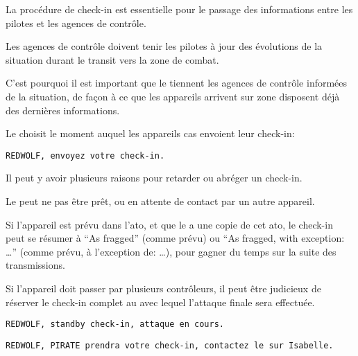 La procédure de check-in est essentielle pour le passage des informations entre les pilotes et les agences de contrôle.

Les agences de contrôle doivent tenir les pilotes à jour des évolutions de la situation durant le transit vers la zone de combat.

C'est pourquoi il est important que le \ja{} tiennent les agences de contrôle informées de la situation, de façon à ce que les appareils arrivent sur zone disposent déjà des dernières informations.

\begin{e1}
	
	\begin{minipage}{\linewidth}
		\item Le \ja{} choisit le moment auquel les appareils \gls{cas} envoient leur check-in:
		
		\begin{lstlisting}[caption=Check-in: envoi, label=checkinsend]
	REDWOLF, envoyez votre check-in.
		\end{lstlisting}
	\end{minipage}
	
	\item Il peut y avoir plusieurs raisons pour retarder ou abréger un check-in.
	
	Le \ja{} peut ne pas être prêt, ou en attente de contact par un autre appareil.
	
	Si l'appareil est prévu dans l'\gls{ato}, et que le \ja{} a une copie de cet \gls{ato}, le check-in peut se résumer à ``As fragged'' (comme prévu) ou ``As fragged, with exception: \ldots{}'' (comme prévu, à l'exception de: \ldots{}), pour gagner du temps sur la suite des transmissions.
	
	Si l'appareil doit passer par plusieurs contrôleurs, il peut être judicieux de réserver le check-in complet au \ja{} avec lequel l'attaque finale sera effectuée.
	
	\begin{minipage}{\linewidth}
	\begin{lstlisting}[caption=Check-in: standby, label=checkinstandby]
	REDWOLF, standby check-in, attaque en cours.
	\end{lstlisting}
	\end{minipage}
	
	\begin{minipage}{\linewidth}
	\begin{lstlisting}[caption=Check-in: autre contrôleur, label=checkinothercontrol]
	REDWOLF, PIRATE prendra votre check-in, contactez le sur Isabelle.
	\end{lstlisting}
	\end{minipage}
	

\end{e1}
